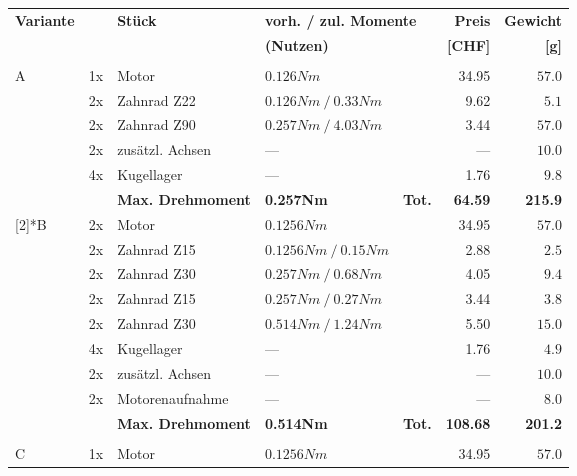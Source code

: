 \begin{longtable}{p{0.5cm}p{0.8cm}lp{3cm}p{0.5cm}rr} 
    \textbf{Variante}& & \textbf{Stück} & \multicolumn{2}{p{3.7cm}}{\textbf{vorh. / zul. Momente}} &
    \textbf{Preis} & \textbf{Gewicht} \\
    & & & \multicolumn{2}{p{3.7cm}}{\textbf{(Nutzen)}} & \textbf{[CHF]} & \textbf{[g]} \\\hline
      &       &                 &                      & &          &  \\\endhead
    \multirow{6}[2]{*}{A}
      & 1x    & Motor           & $0.126 Nm$           & & 34.95  & $57.0$ \\
      & 2x    & Zahnrad Z22     & $0.126 Nm~/~0.33 Nm$ & &  9.62  & $5.1$  \\
      & 2x    & Zahnrad Z90     & $0.257 Nm~/~4.03 Nm$ & &  3.44  & $57.0$ \\
      & 2x    & zusätzl. Achsen & {---}                & & {---}  & $10.0$ \\
      & 4x    & Kugellager      & {---}                & &  1.76  & $9.8$  \\
      &  &  \textbf{Max. Drehmoment} & \textbf{0.257Nm} & \textbf{Tot.}& \textbf{64.59} & \textbf{215.9} \\
      \newpage
    \multirow{8}[2]{*}{B}
      & 2x    & Motor           & $0.1256 Nm$          & & 34.95  & $57.0$ \\
      & 2x    & Zahnrad Z15     & $0.1256 Nm~/~0.15 Nm$& & 2.88   & $2.5$  \\
      & 2x    & Zahnrad Z30     & $0.257 Nm~/~0.68 Nm$ & & 4.05   & $9.4$  \\
      & 2x    & Zahnrad Z15     & $0.257 Nm~/~0.27 Nm$ & & 3.44   & $3.8$  \\
      & 2x    & Zahnrad Z30     & $0.514 Nm~/~1.24 Nm$ & & 5.50   & $15.0$ \\
      & 4x    & Kugellager      & {---}                & & 1.76   & $4.9$  \\
      & 2x    & zusätzl. Achsen & {---}                & & {---}  & $10.0$ \\
      & 2x    & Motorenaufnahme & {---}                & & {---}  & $8.0$  \\
      & &\textbf{Max. Drehmoment} & \textbf{0.514Nm}   &\textbf{Tot.} & \textbf{108.68} & \textbf{201.2} \\
      &       &                 &                      & &          &  \\
    \multirow{8}[2]{*}{C} 
      & 1x    & Motor           & $0.1256 Nm$          & & 34.95  & $57.0$ \\

\end{longtable}
